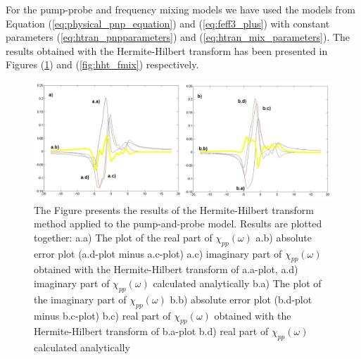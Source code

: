 \documentclass[12pt,twoside,a4paper]{article}
\numberwithin{equation}{subsection}
\numberwithin{figure}{subsection}
\begin{document}
For the pump-probe and frequency mixing models we have used the models from Equation (\ref{eq:physical_pnp_equation}) and (\ref{eq:feff3_plus}) with constant parameters (\ref{eq:htran_pnpparameters}) and (\ref{eq:htran_mix_parameters}). The results obtained with the Hermite-Hilbert transform has been presented in Figures (\ref{fig:hht_pnp}) and (\ref{fig:hht_fmix}) respectively.

\begin{figure} 
  \includegraphics[width=150mm]{img/hht_pnp.png}
  \caption{ The Figure presents the results of the Hermite-Hilbert transform method applied to the pump-and-probe model. Results are plotted together: 
     a.a) The plot of the real part of ${\chi_{pp}}(\omega )$
     a.b) absolute error plot (a.d-plot minus a.c-plot)
     a.c) imaginary part of ${\chi_{pp}}(\omega )$ obtained with the Hermite-Hilbert transform of a.a-plot, 
     a.d) imaginary part of ${\chi_{pp}}(\omega )$ calculated analytically 
     b.a) The plot of the imaginary part of ${\chi_{pp}}(\omega )$ 
     b.b) absolute error plot (b.d-plot minus b.c-plot)
     b.c) real part of ${\chi_{pp}}(\omega )$ obtained with the Hermite-Hilbert transform of b.a-plot 
     b.d) real part of $\chi_{pp} (\omega )$ calculated analytically 
     \label{fig:hht_pnp}
     }
\end{figure} 
\end{document}
